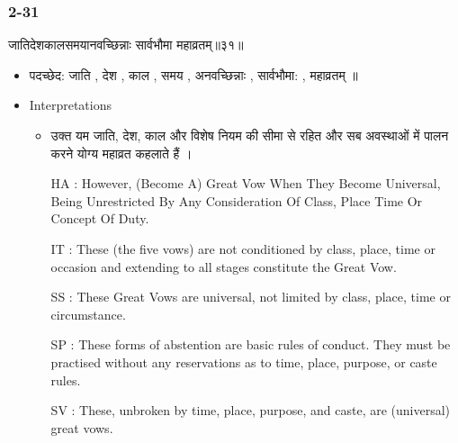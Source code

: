 \begin{frame}[fragile]\frametitle{2-31}
\begin{sanskrit}
जातिदेशकालसमयानवच्छिन्नाः सार्वभौमा महाव्रतम्॥३१॥
\end{sanskrit}

	\begin{itemize}
	\item पदच्छेद: जाति , देश , काल , समय , अनवच्छिन्नाः , सार्वभौमा: , महाव्रतम् ॥
	\item Interpretations
		\begin{itemize}
		\item उक्त यम जाति, देश, काल और विशेष नियम की सीमा से रहित और सब अवस्थाओं में पालन करने योग्य महाव्रत कहलाते हैं ।
		\item [HA]: However, (Become A) Great Vow When They Become Universal, Being Unrestricted By Any Consideration Of Class, Place Time Or Concept Of Duty.
		\item [IT]: These (the five vows) are not conditioned by class, place, time or occasion and extending to all stages constitute the Great Vow.
		\item [SS]: These Great Vows are universal, not limited by class, place, time or circumstance.
		\item [SP]: These forms of abstention are basic rules of conduct. They must be practised without any reservations as to time, place, purpose, or caste rules.
		\item [SV]: These, unbroken by time, place, purpose, and caste, are (universal) great vows. 
		\end{itemize}
	\end{itemize}	
\end{frame}



